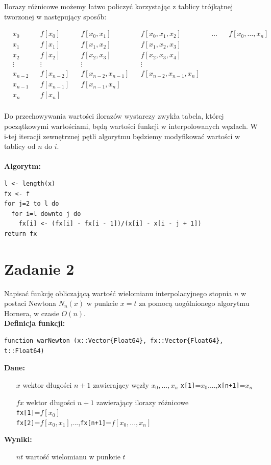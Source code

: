 \documentclass[12pt]{article}
\begin{document}
\noindent Ilorazy różnicowe możemy łatwo policzyć korzystając z tablicy trójkątnej tworzonej w następujący sposób:
\begin{center}
  \begin{align*}
&  x_0    & &f[x_0]     & &f[x_0, x_1] 			& &f[x_0, x_1, x_2] & &\hdots & &f[x_0, \ldots, x_n]\\
&  x_1    & &f[x_1]     & &f[x_1, x_2] 			& &f[x_1, x_2, x_3]\\
&  x_2    & &f[x_2]     & &f[x_2, x_3] 			& &f[x_2, x_3, x_4]\\
& \vdots  & &\vdots     & &\vdots				& &\vdots\\
& x_{n-2} & &f[x_{n-2}] & &f[x_{n-2}, x_{n-1}]	& &f[x_{n-2}, x_{n-1}, x_n]\\
& x_{n-1} & &f[x_{n-1}] & &f[x_{n-1}, x_n] 		& &\\
& x_n     & &f[x_n]     & & \\
\end{align*}
\endminipage\hfill
\end{center}

\noindent Do przechowywania wartości ilorazów wystarczy zwykła tabela, której początkowymi wartościami, będą wartości funkcji w interpolowanych węzłach. W i-tej iteracji zewnętrznej pętli algorytmu będziemy modyfikować wartości w tablicy od $n$ do $i$.
\\
\\
\noindent \textbf{Algorytm:}
\begin{verbatim}
l <- length(x)
fx <- f
for j=2 to l do
  for i=l downto j do
    fx[i] <- (fx[i] - fx[i - 1])/(x[i] - x[i - j + 1])
return fx
\end{verbatim}

\section{Zadanie 2}
Napisać funkcję obliczającą wartość wielomianu interpolacyjnego stopnia $n$ w postaci Newtona $N_n(x)$ w punkcie $x=t$ za pomocą uogólnionego algorytmu Hornera, w czasie $O(n)$.\\
\textbf{Definicja funkcji:}

\begin{verbatim}
function warNewton (x::Vector{Float64}, fx::Vector{Float64}, t::Float64)
\end{verbatim}
\textbf{Dane:}
\begin{itemize}[leftmargin=4.0cm,labelsep=0.4cm]
\item[$x$] wektor długości $n + 1$ zawierający węzły $x_0, ..., x_n$ \texttt{x[1]}=$x_0$,...,\texttt{x[n+1]}=$x_n$
\item[$fx$] wektor długości $n+1$ zawierający ilorazy różnicowe \\
\texttt{fx[1]}=$f[x_0]$\\
\texttt{fx[2]}=$f[x_0, x_1]$,...,\texttt{fx[n+1]}=$f[x_0,...,x_n]$
\end{itemize}
\textbf{Wyniki:} 
\begin{itemize}[leftmargin=4.0cm,labelsep=0.4cm]
\item[$nt$] wartość wielomianu w punkcie $t$ \\
\end{itemize}
\end{document}
